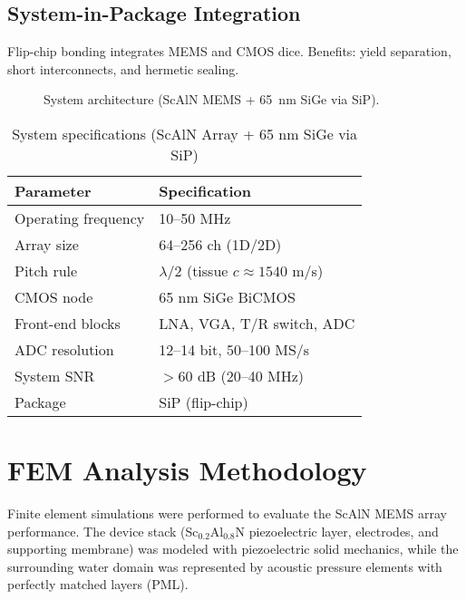 \documentclass[conference]{IEEEtran}
\begin{document}
\subsection{System-in-Package Integration}
Flip-chip bonding integrates MEMS and CMOS dice. Benefits: yield separation, short interconnects, and hermetic sealing.

\begin{figure}[!t]
\centering
{}
\caption{System architecture (ScAlN MEMS + 65~nm SiGe via SiP).}
\label{fig:arch}
\end{figure}

\begin{table}[!t]
\caption{System specifications (ScAlN Array + 65 nm SiGe via SiP)}
\label{tab:spec}
\centering
\begin{tabular}{@{}ll@{}}
\toprule
\textbf{Parameter} & \textbf{Specification}\\
\midrule
Operating frequency & 10--50 MHz\\
Array size & 64--256 ch (1D/2D)\\
Pitch rule & $\lambda/2$ (tissue $c\!\approx\!1540$ m/s)\\
CMOS node & 65 nm SiGe BiCMOS\\
Front-end blocks & LNA, VGA, T/R switch, ADC\\
ADC resolution & 12--14 bit, 50--100 MS/s\\
System SNR & $>60$ dB (20--40 MHz)\\
Package & SiP (flip-chip)\\
\bottomrule
\end{tabular}
\end{table}

\section{FEM Analysis Methodology}
Finite element simulations were performed to evaluate the ScAlN MEMS array performance. The device stack (Sc$_{0.2}$Al$_{0.8}$N piezoelectric layer, electrodes, and supporting membrane) was modeled with piezoelectric solid mechanics, while the surrounding water domain was represented by acoustic pressure elements with perfectly matched layers (PML).
\end{document}
